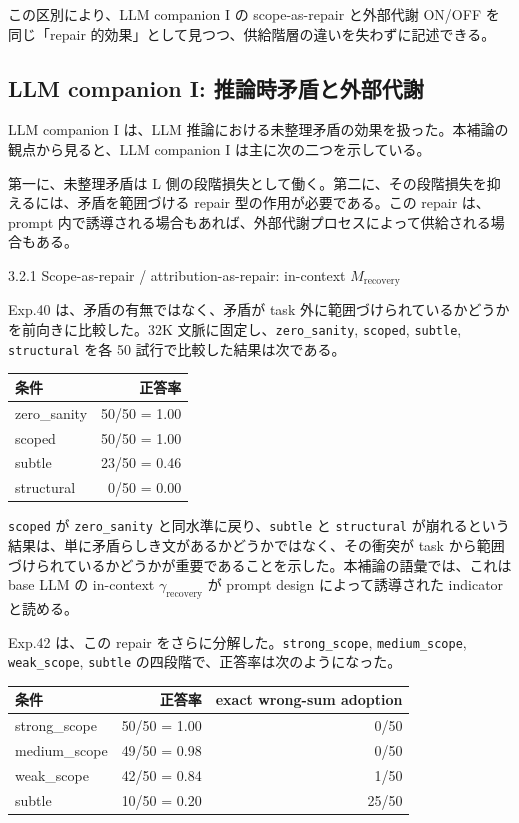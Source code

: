 \documentclass[12pt,a4paper]{article}
\begin{document}
この区別により、LLM companion I の scope-as-repair と外部代謝 ON/OFF を同じ「repair 的効果」として見つつ、供給階層の違いを失わずに記述できる。

\subsection{LLM companion I: 推論時矛盾と外部代謝}\label{llm-companion-i-ux63a8ux8ad6ux6642ux77dbux76feux3068ux5916ux90e8ux4ee3ux8b1d}

LLM companion I は、LLM 推論における未整理矛盾の効果を扱った。本補論の観点から見ると、LLM companion I は主に次の二つを示している。

第一に、未整理矛盾は L 側の段階損失として働く。第二に、その段階損失を抑えるには、矛盾を範囲づける repair 型の作用が必要である。この repair は、prompt 内で誘導される場合もあれば、外部代謝プロセスによって供給される場合もある。

3.2.1 Scope-as-repair / attribution-as-repair: in-context \(M_{\mathrm{recovery}}\)

Exp.40 は、矛盾の有無ではなく、矛盾が task 外に範囲づけられているかどうかを前向きに比較した。32K 文脈に固定し、\texttt{zero\_sanity}, \texttt{scoped}, \texttt{subtle}, \texttt{structural} を各 50 試行で比較した結果は次である。

{\def\LTcaptype{table} %
\begin{longtable}[]{@{}lr@{}}
\toprule\noalign{}
条件 & 正答率 \\
\midrule\noalign{}
\endhead
\bottomrule\noalign{}
\endlastfoot
zero\_sanity & 50/50 = 1.00 \\
scoped & 50/50 = 1.00 \\
subtle & 23/50 = 0.46 \\
structural & 0/50 = 0.00 \\
\end{longtable}
}

\texttt{scoped} が \texttt{zero\_sanity} と同水準に戻り、\texttt{subtle} と \texttt{structural} が崩れるという結果は、単に矛盾らしき文があるかどうかではなく、その衝突が task から範囲づけられているかどうかが重要であることを示した。本補論の語彙では、これは base LLM の in-context \(\gamma_{\mathrm{recovery}}\) が prompt design によって誘導された indicator と読める。

Exp.42 は、この repair をさらに分解した。\texttt{strong\_scope}, \texttt{medium\_scope}, \texttt{weak\_scope}, \texttt{subtle} の四段階で、正答率は次のようになった。

{\def\LTcaptype{table} %
\begin{longtable}[]{@{}lrr@{}}
\toprule\noalign{}
条件 & 正答率 & exact wrong-sum adoption \\
\midrule\noalign{}
\endhead
\bottomrule\noalign{}
\endlastfoot
strong\_scope & 50/50 = 1.00 & 0/50 \\
medium\_scope & 49/50 = 0.98 & 0/50 \\
weak\_scope & 42/50 = 0.84 & 1/50 \\
subtle & 10/50 = 0.20 & 25/50 \\
\end{longtable}
}
\end{document}
